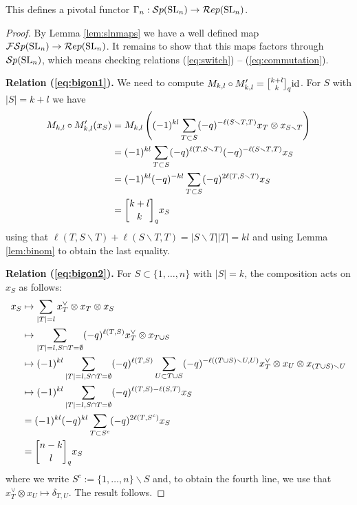 \documentclass[11pt]{amsart}
\begin{document}
\begin{thm}\label{thm:gamma}
This defines a pivotal functor $\Gamma_n: {\mathcal{S}p}({\rm{SL}}_n) \rightarrow \mathcal{R}ep({\rm{SL}}_n)$.
\end{thm}
\begin{proof}
By Lemma \ref{lem:slnmaps} we have a well defined map ${\mathcal{FS}p}({\rm{SL}}_n) \rightarrow \mathcal{R}ep({\rm{SL}}_n)$. It remains to show that this maps factors through ${\mathcal{S}p}({\rm{SL}}_n)$, which means checking relations (\ref{eq:switch}) -- (\ref{eq:commutation}).

{\bf Relation (\ref{eq:bigon1}).} We need to compute $M_{k,l} \circ M'_{k,l} = \qBinomial{k+l}{k} {\rm{id}}$. For $S $ with $|S|=k+l$ we have
\begin{align*}
M_{k,l} \circ M'_{k,l}(x_S)
&= M_{k,l} \left( (-1)^{kl} \sum_{T \subset S} (-q)^{- \ell( S \smallsetminus T, T)} x_T \otimes x_{S \smallsetminus T} \right) \\
&= (-1)^{kl}\sum_{T \subset S} (-q)^{\ell(T, S \smallsetminus T)} (-q)^{- \ell( S \smallsetminus T, T)} x_S \\
&= (-1)^{kl} (-q)^{-kl} \sum_{T \subset S} (-q)^{2\ell(T, S \smallsetminus T)} x_S \\
&= \qBinomial{k+l}{k} x_S
\end{align*}
using that $ \ell(T, S \smallsetminus T) + \ell( S \smallsetminus T, T) = |S \smallsetminus T||T| =kl$ and using Lemma \ref{lem:binom} to obtain the last equality. 


{\bf Relation (\ref{eq:bigon2}).} For $S \subset \{1,\dots,n\}$ with $|S|=k$, the composition acts on $x_S$ as follows:
\begin{align*}
x_S
&\mapsto \sum_{|T|=l} x_T^\vee \otimes x_T \otimes x_S \\
&\mapsto \sum_{|T|=l, S \cap T = \emptyset} (-q)^{\ell(T,S)} x_T^\vee \otimes x_{T \cup S} \\
&\mapsto (-1)^{kl} \sum_{|T|=l, S \cap T = \emptyset} (-q)^{\ell(T,S)} \sum_{U \subset T \cup S} (-q)^{-\ell((T \cup S) \smallsetminus U,U)} x_T^\vee \otimes x_U \otimes x_{(T \cup S) \smallsetminus U} \\
&\mapsto (-1)^{kl} \sum_{|T|=l, S \cap T = \emptyset} (-q)^{\ell(T,S) - \ell(S,T)} x_S \\
&= (-1)^{kl} (-q)^{kl} \sum_{T \subset S^c} (-q)^{2\ell(T, S^c)} x_S \\
&= \qBinomial{n-k}{l} x_S
\end{align*}
where we write $S^c := \{1, \dots, n\} \smallsetminus S$ and, to obtain the fourth line, we use that $x_T^\vee \otimes x_U \mapsto \delta_{T,U}$. The result follows.


\end{proof}
\end{document}
